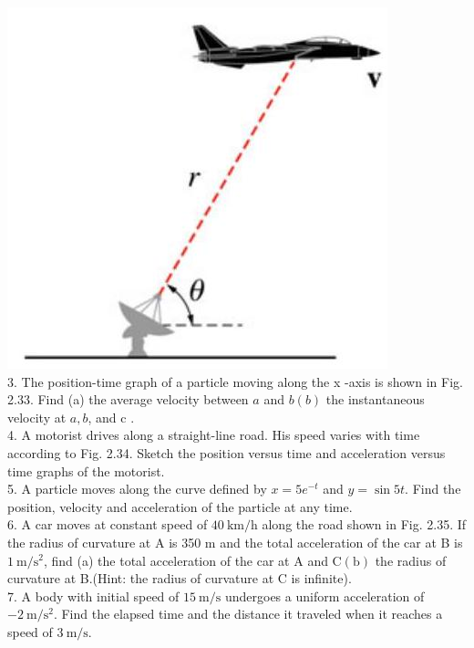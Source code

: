 \documentclass[10pt]{article}
\begin{document}
\includegraphics[max width=\textwidth, center]{2024_09_13_db1f357d2aad0a03eb2eg-045(1)}\\
3. The position-time graph of a particle moving along the x -axis is shown in Fig. 2.33. Find (a) the average velocity between $a$ and $b(b)$ the instantaneous velocity at $a, b$, and c .\\
4. A motorist drives along a straight-line road. His speed varies with time according to Fig. 2.34. Sketch the position versus time and acceleration versus time graphs of the motorist.\\
5. A particle moves along the curve defined by $x=5 e^{-t}$ and $y=\sin 5 t$. Find the position, velocity and acceleration of the particle at any time.\\
6. A car moves at constant speed of $40 \mathrm{~km} / \mathrm{h}$ along the road shown in Fig. 2.35. If the radius of curvature at A is 350 m and the total acceleration of the car at B is $1 \mathrm{~m} / \mathrm{s}^{2}$, find (a) the total acceleration of the car at A and $\mathrm{C}(\mathrm{b})$ the radius of curvature at B.(Hint: the radius of curvature at C is infinite).\\
7. A body with initial speed of $15 \mathrm{~m} / \mathrm{s}$ undergoes a uniform acceleration of $-2 \mathrm{~m} / \mathrm{s}^{2}$. Find the elapsed time and the distance it traveled when it reaches a speed of $3 \mathrm{~m} / \mathrm{s}$.\\
\end{document}

